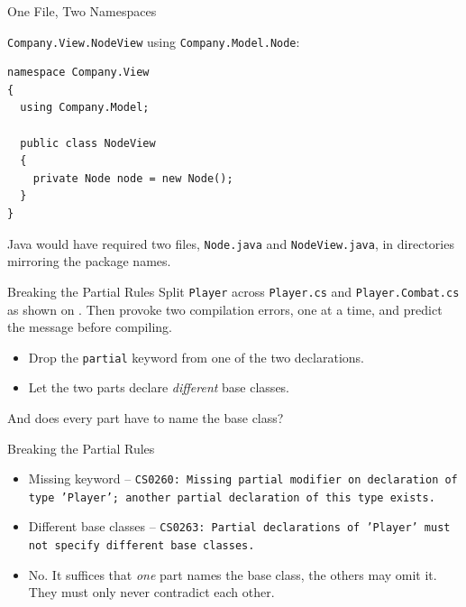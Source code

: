 \begin{solutionframe}{One File, Two Namespaces}

  \texttt{Company.View.NodeView} using  \texttt{Company.Model.Node}:

  \begin{lstlisting}[basicstyle=\scriptsize\ttfamily]
namespace Company.View
{
  using Company.Model;

  public class NodeView
  {
    private Node node = new Node();
  }
}
  \end{lstlisting}
  Java would have required two files, \texttt{Node.java} and
  \texttt{NodeView.java}, in directories mirroring the package names.
  \vspace{2ex}

\end{solutionframe}

\begin{exerciseframe}{Breaking the Partial Rules}
  Split \texttt{Player} across \texttt{Player.cs} and
  \texttt{Player.Combat.cs} as shown on . Then provoke
  two compilation errors, one at a
  time, and predict the message before compiling.
  \vspace{1ex}

  \begin{itemize}
    \item Drop the \texttt{partial} keyword from one of the two declarations.
    \item Let the two parts declare \emph{different} base classes.
  \end{itemize}
  \vspace{1ex}

  And does every part have to name the base class?
\end{exerciseframe}

\begin{solutionframe}{Breaking the Partial Rules}
  \begin{itemize}
    \item Missing keyword -- \texttt{CS0260: Missing partial modifier on
      declaration of type 'Player'; another partial declaration of this type
      exists.}
    \item Different base classes -- \texttt{CS0263: Partial declarations of
      'Player' must not specify different base classes.}
    \item No. It suffices that \emph{one} part names the base class, the others
      may omit it. They must only never contradict each other.
  \end{itemize}
  \vspace{4ex}

\end{solutionframe}

